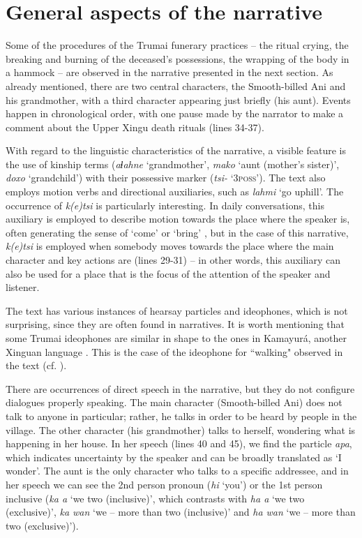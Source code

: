 \documentclass[output=paper,
modfonts,nonflat
]{langsci/langscibook}
\begin{document}
\section{General aspects of the narrative}  
Some of the procedures of the Trumai funerary practices – the ritual crying, the breaking and burning of the deceased's possessions, the wrapping of the body in a hammock – are observed in the narrative presented in the next section. As already mentioned, there are two central characters, the Smooth-billed Ani and his grandmother, with a third character appearing just briefly (his aunt). Events happen in chronological order, with one pause made by the narrator to make a comment about the Upper Xingu death rituals (lines 34-37).

With regard to the linguistic characteristics of the narrative, a visible feature is the use of kinship terms (\textit{aɬahne} ‘grandmother', \textit{mako} ‘aunt (mother's sister)', \textit{doxo} ‘grandchild') with their possessive marker (\textit{tsi-} ‘3\textsc{poss}'). The text also employs motion verbs and directional auxiliaries, such as \textit{lahmi} ‘go uphill'. The occurrence of \textit{k(e)tsi} is particularly interesting. In daily conversations, this auxiliary is employed to describe motion towards the place where the speaker is, often generating the sense of ‘come' or ‘bring' \citep{Guirardello-Damian2012}, but in the case of this narrative, \textit{k(e)tsi} is employed when somebody moves towards the place where the main character and key actions are (lines 29-31) – in other words, this auxiliary can also be used for a place that is the focus of the attention of the speaker and listener.

The text has various instances of hearsay particles and ideophones, which is not surprising, since they are often found in narratives. It is worth mentioning that some Trumai ideophones are similar in shape to the ones in Kamayurá, another Xinguan language \citep{Guirardello-Damian2014}. This is the case of the ideophone for “walking" observed in the text (cf. ). 

There are occurrences of direct speech in the narrative, but they do not configure dialogues properly speaking. The main character (Smooth-billed Ani) does not talk to anyone in particular; rather, he  talks in order to be heard by people in the village. The other character (his grandmother) talks to herself, wondering what is happening in her house. In her speech (lines 40 and 45), we find the particle \textit{apa}, which indicates uncertainty by the speaker and can be broadly translated as ‘I wonder'. The aunt is the only character who talks to a specific addressee, and in her speech we can see the 2nd person pronoun (\textit{hi} ‘you') or the 1st person inclusive (\textit{ka a} ‘we two (inclusive)', which contrasts with \textit{ha a} ‘we two (exclusive)', \textit{ka wan} ‘we – more than two (inclusive)' and \textit{ha wan} ‘we – more than two (exclusive)').
\end{document}
